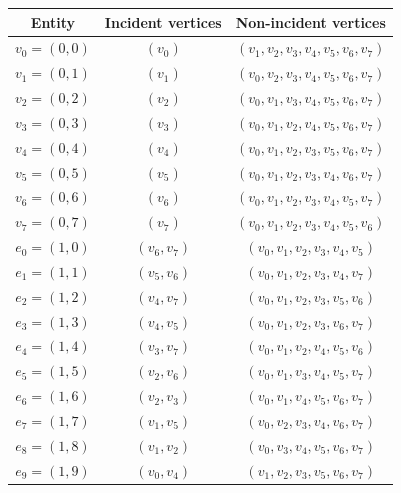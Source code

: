 \vspace{-0.5cm}
\begin{table}[H]
\small
\linespread{1.2}\selectfont
  \begin{center}
    \begin{tabular}{|c|c|c|}
      \hline
      Entity & Incident vertices & Non-incident vertices \\
      \hline
      \hline
      $v_0 = (0, 0)$ & $(v_0)$ & $(v_1, v_2, v_3, v_4, v_5, v_6, v_7)$ \\
      \hline
      $v_1 = (0, 1)$ & $(v_1)$ & $(v_0, v_2, v_3, v_4, v_5, v_6, v_7)$ \\
      \hline
      $v_2 = (0, 2)$ & $(v_2)$ & $(v_0, v_1, v_3, v_4, v_5, v_6, v_7)$ \\
      \hline
      $v_3 = (0, 3)$ & $(v_3)$ & $(v_0, v_1, v_2, v_4, v_5, v_6, v_7)$ \\
      \hline
      $v_4 = (0, 4)$ & $(v_4)$ & $(v_0, v_1, v_2, v_3, v_5, v_6, v_7)$ \\
      \hline
      $v_5 = (0, 5)$ & $(v_5)$ & $(v_0, v_1, v_2, v_3, v_4, v_6, v_7)$ \\
      \hline
      $v_6 = (0, 6)$ & $(v_6)$ & $(v_0, v_1, v_2, v_3, v_4, v_5, v_7)$ \\
      \hline
      $v_7 = (0, 7)$ & $(v_7)$ & $(v_0, v_1, v_2, v_3, v_4, v_5, v_6)$ \\
      \hline
      $e_0 = (1, 0)$ & $(v_6, v_7)$ & $(v_0, v_1, v_2, v_3, v_4, v_5)$ \\
      \hline
      $e_1 = (1, 1)$ & $(v_5, v_6)$ & $(v_0, v_1, v_2, v_3, v_4, v_7)$ \\
      \hline
      $e_2 = (1, 2)$ & $(v_4, v_7)$ & $(v_0, v_1, v_2, v_3, v_5, v_6)$ \\
      \hline
      $e_3 = (1, 3)$ & $(v_4, v_5)$ & $(v_0, v_1, v_2, v_3, v_6, v_7)$ \\
      \hline
      $e_4 = (1, 4)$ & $(v_3, v_7)$ & $(v_0, v_1, v_2, v_4, v_5, v_6)$ \\
      \hline
      $e_5 = (1, 5)$ & $(v_2, v_6)$ & $(v_0, v_1, v_3, v_4, v_5, v_7)$ \\
      \hline
      $e_6 = (1, 6)$ & $(v_2, v_3)$ & $(v_0, v_1, v_4, v_5, v_6, v_7)$ \\
      \hline
      $e_7 = (1, 7)$ & $(v_1, v_5)$ & $(v_0, v_2, v_3, v_4, v_6, v_7)$ \\
      \hline
      $e_8 = (1, 8)$ & $(v_1, v_2)$ & $(v_0, v_3, v_4, v_5, v_6, v_7)$ \\
      \hline
      $e_9 = (1, 9)$ & $(v_0, v_4)$ & $(v_1, v_2, v_3, v_5, v_6, v_7)$ \\

\end{tabular}
\end{center}
\end{table}
